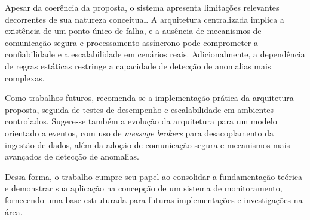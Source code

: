 \documentclass[
    12pt
    ,oneside
    ,a4paper
    ,chapter=TITLE
    ,section=TITLE
    ,sumario=abnt-6027-2012]{abntex2}
\begin{document}
Apesar da coerência da proposta, o sistema apresenta limitações relevantes decorrentes 
de sua natureza conceitual. A arquitetura centralizada implica a existência de um ponto 
único de falha, e a ausência de mecanismos de comunicação segura e processamento 
assíncrono pode comprometer a confiabilidade e a escalabilidade em cenários reais. 
Adicionalmente, a dependência de regras estáticas restringe a capacidade de detecção de 
anomalias mais complexas.

Como trabalhos futuros, recomenda-se a implementação prática da arquitetura proposta, 
seguida de testes de desempenho e escalabilidade em ambientes controlados. Sugere-se 
também a evolução da arquitetura para um modelo orientado a eventos, com uso de 
\textit{message brokers} para desacoplamento da ingestão de dados, além da adoção de 
comunicação segura e mecanismos mais avançados de detecção de anomalias.

Dessa forma, o trabalho cumpre seu papel ao consolidar a fundamentação teórica e 
demonstrar sua aplicação na concepção de um sistema de monitoramento, fornecendo uma 
base estruturada para futuras implementações e investigações na área.


\postextual


\end{document}
